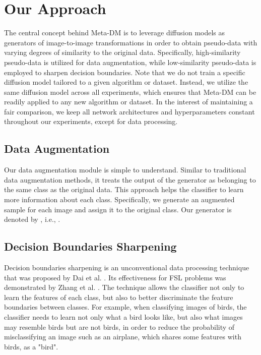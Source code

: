 \documentclass{article}
\begin{document}
\section{Our Approach}


The central concept behind Meta-DM is to leverage diffusion models as generators of image-to-image transformations in order to obtain pseudo-data with varying degrees of similarity to the original data.  Specifically, high-similarity pseudo-data is utilized for data augmentation, while low-similarity pseudo-data is employed to sharpen decision boundaries. Note that we do not train a specific diffusion model tailored to a given algorithm or dataset.  Instead, we utilize the same diffusion model across all experiments, which ensures that Meta-DM can be readily applied to any new algorithm or dataset.  In the interest of maintaining a fair comparison, we keep all network architectures and hyperparameters constant throughout our experiments, except for data processing. 


\subsection{Data Augmentation}


Our data augmentation module is simple to understand. Similar to traditional data augmentation methods, it treats the output of the generator as belonging to the same class as the original data. This approach helps the classifier to learn more information about each class. Specifically, we generate an augmented sample for each image and assign it to the original class. Our generator is denoted by , i.e., .


\subsection{Decision Boundaries Sharpening}
\label{Decision Boundaries Sharpening}


Decision boundaries sharpening is an unconventional data processing technique that was proposed by Dai et al. \cite{i35}. Its effectiveness for FSL problems was demonstrated by Zhang et al. \cite{i3}. The technique allows the classifier not only to learn the features of each class, but also to better discriminate the feature boundaries between classes. For example, when classifying images of birds, the classifier needs to learn not only what a bird looks like, but also what images may resemble birds but are not birds, in order to reduce the probability of misclassifying an image such as an airplane, which shares some features with birds, as a "bird". 
\end{document}
